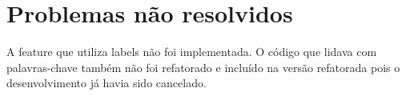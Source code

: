



\section{Problemas não resolvidos}

A feature que utiliza labels não foi implementada. O código que
lidava com palavras-chave também não foi refatorado e incluído na
versão refatorada pois o desenvolvimento já havia sido cancelado. 
